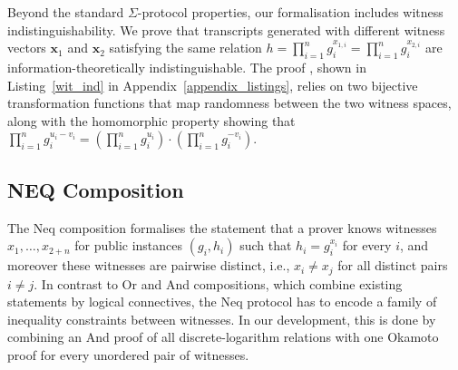 \documentclass[sigconf,anonymous,review]{acmart}
\begin{document}
Beyond the standard $\Sigma$-protocol properties, our formalisation includes witness indistinguishability. We prove that transcripts generated with different witness 
vectors $\mathbf{x}_1$ and $\mathbf{x}_2$ satisfying the same relation $h = \prod_{i=1}^{n} g_i^{x_{1,i}} = 
\prod_{i=1}^{n} g_i^{x_{2,i}}$ are information-theoretically indistinguishable. The proof \texttt{}, shown in Listing~\ref{wit_ind} in Appendix~\ref{appendix_listings}, relies on two 
bijective transformation functions that map 
randomness between the two witness spaces, along with the homomorphic property showing that 
$\prod_{i=1}^{n} g_i^{u_i - v_i} = \left(\prod_{i=1}^{n} g_i^{u_i}\right) \cdot 
\left(\prod_{i=1}^{n} g_i^{-v_i}\right)$.



\subsection{NEQ Composition}
The Neq composition formalises the statement that a prover knows witnesses
$x_1, \ldots, x_{2+n}$ for public instances $(g_i, h_i)$ such that $h_i = g_i^{x_i}$ for every
$i$, and moreover these witnesses are pairwise distinct, i.e., $x_i \neq x_j$ for all distinct pairs $i \neq j$. 
In contrast to Or and And compositions, which combine existing statements by logical connectives, the Neq protocol has to encode a family of inequality constraints between witnesses.  In our development, this is done by combining an And proof of all discrete-logarithm relations with one Okamoto proof for every unordered pair of witnesses.
\end{document}
